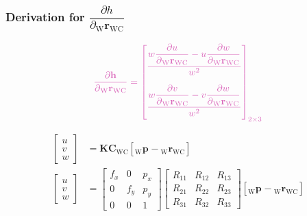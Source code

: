 \documentclass{article}
\renewcommand{\Vec}[1]{{\mathbf{#1}}}
\newcommand{\Mat}[1]{{\mathbf{#1}}}
\newcommand{\cam}{{\text{C}}}
\newcommand{\world}{{\text{W}}}
\newcommand{\KineNotationTransform}[3]{{{#1}_{#2#3}}}
\newcommand{\KineNotation}[3]{{{{}_{#2}} {#1}_{#2#3}}}
\newcommand{\KineNotationPart}[3]{{{{}_{#2}} {#1}_{#3}}}
\newcommand{\pos}{{\Vec{r}}}
\newcommand{\Pos}[2]{{\KineNotation{\pos}{#1}{#2}}}
\newcommand{\rot}{{\Mat{C}}}
\newcommand{\Rot}[2]{{\KineNotationTransform{\rot}{#1}{#2}}}
\newcommand{\point}{\Vec{p}}
\newcommand{\Pt}[1]{{\KineNotationPart{\point}{#1}{}}}
\newcommand{\camRot}{{\Rot{\world}{\cam}}}
\newcommand{\camPos}{{\Pos{\world}{\cam}}}
\newcommand{\projFunc}{{\Vec{h}}}
\begin{document}
\subsubsection*{Derivation for \color{Thistle}
$\dfrac{\partial{h}}{\partial{\camPos}}$}

\begin{align}
  \color{Thistle}
  \dfrac{\partial{\projFunc}}{\partial{\camPos}} =
  \begin{bmatrix}
    \dfrac{
      w \dfrac{\partial{u}}{\partial{\camPos}} -
      u \dfrac{\partial{w}}{\partial{\camPos}}
    }{w^{2}} \vspace{1.0em} \\
    \dfrac{
      w \dfrac{\partial{v}}{\partial{\camPos}} -
      v \dfrac{\partial{w}}{\partial{\camPos}}
    }{w^{2}} \vspace{0.5em}
  \end{bmatrix}_{2 \times 3}
\end{align}

\begin{align}
  \begin{bmatrix} u \\ v \\ w \end{bmatrix}
    &= \Mat{K} \camRot [\Pt{\world} - \camPos]
    \nonumber \\
  \begin{bmatrix} u \\ v \\ w \end{bmatrix}
  &= \begin{bmatrix}
      f_x & 0 & p_x \\
      0 & f_y & p_y \\
      0 & 0 & 1
  \end{bmatrix}
  \begin{bmatrix}
      R_{11} & R_{12} & R_{13} \\
      R_{21} & R_{22} & R_{23} \\
      R_{31} & R_{32} & R_{33}
  \end{bmatrix}
  [\Pt{\world} - \camPos]
  \nonumber
\end{align}
\end{document}
